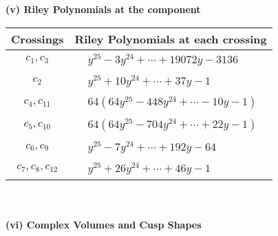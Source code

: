 \documentclass[1p]{elsarticle_modified}
\theoremstyle{definition}
\begin{document}
\flushleft \textbf{(v) Riley Polynomials at the component}\newline \\
\begin{tabular}{m{50pt}|m{274pt}}
Crossings & \hspace{64pt}Riley Polynomials at each crossing \\
\hline $$\begin{aligned}c_{1},c_{3}\end{aligned}$$&$\begin{aligned}
&y^{25}-3 y^{24}+\cdots+19072 y-3136
\end{aligned}$\\
\hline $$\begin{aligned}c_{2}\end{aligned}$$&$\begin{aligned}
&y^{25}+10 y^{24}+\cdots+37 y-1
\end{aligned}$\\
\hline $$\begin{aligned}c_{4},c_{11}\end{aligned}$$&$\begin{aligned}
&64(64 y^{25}-448 y^{24}+\cdots-10 y-1)
\end{aligned}$\\
\hline $$\begin{aligned}c_{5},c_{10}\end{aligned}$$&$\begin{aligned}
&64(64 y^{25}-704 y^{24}+\cdots+22 y-1)
\end{aligned}$\\
\hline $$\begin{aligned}c_{6},c_{9}\end{aligned}$$&$\begin{aligned}
&y^{25}-7 y^{24}+\cdots+192 y-64
\end{aligned}$\\
\hline $$\begin{aligned}c_{7},c_{8},c_{12}\end{aligned}$$&$\begin{aligned}
&y^{25}+26 y^{24}+\cdots+46 y-1
\end{aligned}$\\
\hline
\end{tabular}\\~\\
\newpage\flushleft \textbf{(vi) Complex Volumes and Cusp Shapes}
\end{document}
